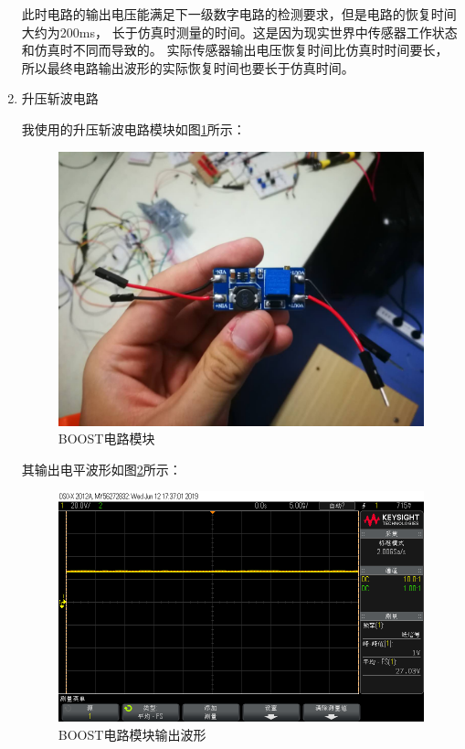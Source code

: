 \documentclass{article}
\begin{document}
\begin{spacing}{1.5}
\begin{enumerate}
    此时电路的输出电压能满足下一级数字电路的检测要求，但是电路的恢复时间大约为200ms，
    长于仿真时测量的时间。这是因为现实世界中传感器工作状态和仿真时不同而导致的。
    实际传感器输出电压恢复时间比仿真时时间要长，所以最终电路输出波形的实际恢复时间也要长于仿真时间。

    \item 升压斩波电路
    
    我使用的升压斩波电路模块如图\ref{fig:module5}所示：

    \begin{figure}[H]
        \centering
        \includegraphics[scale=0.1]{fig/result/module5.png}
        \caption{BOOST电路模块}
        \label{fig:module5}
    \end{figure}
    
    其输出电平波形如图\ref{fig:module5_result1}所示：
    \begin{figure}[H]
        \centering
        \includegraphics[scale=0.3]{fig/result/module5_result1.png}
        \caption{BOOST电路模块输出波形}
        \label{fig:module5_result1}
    \end{figure}


\end{enumerate}
\end{spacing}
\end{document}
